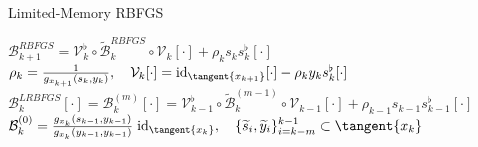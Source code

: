 \documentclass[9pt]{beamer}
\begin{document}
\begin{frame}{Limited-Memory RBFGS}
    \begin{center}
        $\mathcal{B}^{RBFGS}_{k+1}  = \mathcal{V}^{\flat}_k \circ \widetilde{\mathcal{B}}^{RBFGS}_k \circ \mathcal{V}_k [\cdot] + \rho_k s_k s_k^{\flat} [\cdot]$\\[1.\baselineskip]

        $\rho_k = \frac{1}{g_{x_{k+1}}(s_k, y_k)} , \quad \mathcal{V}_k [\cdot] = \mathrm{id}_{\tangent{x_{k+1}}}[\cdot] - \rho_k y_k s^{\flat}_k [\cdot]$ \\[1.\baselineskip]

        $\mathcal{B}^{LRBFGS}_k [\cdot] = \mathcal{B}^{(m)}_k [\cdot] =  \mathcal{V}^{\flat}_{k-1} \circ \widetilde{\mathcal{B}}^{(m-1)}_k \circ \mathcal{V}_{k-1} [\cdot] + \rho_{k-1} s_{k-1} s_{k-1}^{\flat} [\cdot]$\\[1.\baselineskip]

        $\mathcal{B}^{(0)}_k = \frac{g_{x_k}(s_{k-1}, y_{k-1})}{g_{x_k}(y_{k-1}, y_{k-1})} \; \mathrm{id}_{\tangent{x_k}}, \quad \{ \widetilde{s}_i, \widetilde{y}_i\}_{i=k-m}^{k-1} \subset \tangent{x_k}$
    \end{center}
\end{frame}

\end{document}
